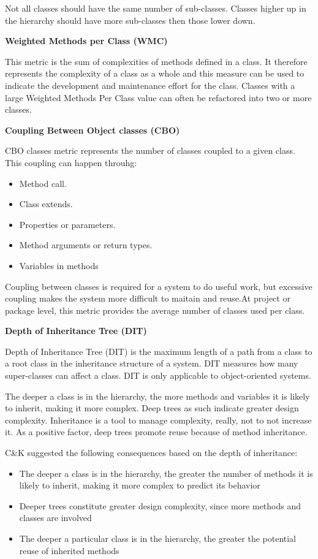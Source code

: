Not all classes should have the same number of sub-classes. Classes higher up in the hierarchy should have more sub-classes then those lower down.


\textbf{Weighted Methods per Class (WMC)}

This metric is the sum of complexities of methods defined in a class. It therefore represents the
complexity of a class as a whole and this measure can be used to indicate the development and
maintenance effort for the class. Classes with a large Weighted Methods Per Class value can often be refactored into two or more classes.

\textbf{Coupling Between Object classes (CBO)}

CBO classes metric represents the number of classes coupled to a given class. This coupling can happen throuhg:
\begin{itemize}
	\item Method call. 
	\item Class extends.
	\item Properties or parameters. 
	\item Method arguments or return types.
	\item Variables in methods
\end{itemize}

Coupling between classes is required for a system to do useful work, but excessive coupling makes the system more difficult to maitain and reuse.At project or package level, this metric provides the average number of classes used per class.

\textbf{Depth of Inheritance Tree (DIT)}

Depth of Inheritance Tree (DIT) is the maximum length of a path from a class to a root class in the inheritance structure of a system. DIT measures how many super-classes can affect a class. DIT is only applicable to object-oriented systems.

The deeper a class is in the hierarchy, the more methods and variables it is likely to inherit, making it more complex. Deep trees as such indicate greater design complexity. Inheritance is a tool to manage complexity, really, not to not increase it. As a positive factor, deep trees promote reuse because of method inheritance.

C\&K suggested the following consequences based on the depth of inheritance:
\begin{itemize}
	\item The deeper a class is in the hierarchy, the greater the number of methods it is likely to inherit, making it more complex to predict its behavior
	\item Deeper trees constitute greater design complexity, since more methods and classes are involved
	\item The deeper a particular class is in the hierarchy, the greater the potential reuse of inherited methods 
\end{itemize}

